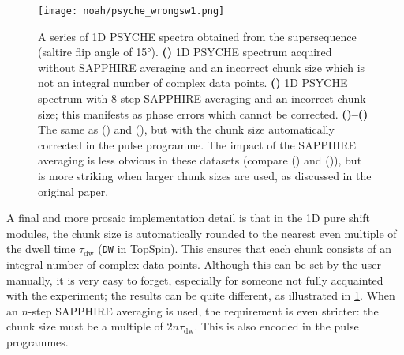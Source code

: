 \begin{figure}[!ht]
    \centering
    \texttt{[image: noah/psyche\_wrongsw1.png]}%
    {\label{fig:psyche_wrongsw1_bad_nosap}}%
    {\label{fig:psyche_wrongsw1_bad_sap}}%
    {\label{fig:psyche_wrongsw1_good_nosap}}%
    {\label{fig:psyche_wrongsw1_good_sap}}%
    \caption[Effect of missetting the chunk size in PSYCHE spectra]{
        A series of 1D PSYCHE spectra obtained from the  supersequence (saltire flip angle of \ang{15}).
        \textbf{()} 1D PSYCHE spectrum acquired without SAPPHIRE averaging and an incorrect chunk size which is not an integral number of complex data points.
        \textbf{()} 1D PSYCHE spectrum with  8-step SAPPHIRE averaging and an incorrect chunk size; this manifests as phase errors which cannot be corrected.
        \textbf{()--()} The same as () and (), but with the chunk size automatically corrected in the pulse programme.
        The impact of the SAPPHIRE averaging is less obvious in these datasets (compare () and ()), but is more striking when larger chunk sizes are used, as discussed in the original paper\autocite{Moutzouri2017CC}.
    }
    \label{fig:psyche_wrongsw1}
\end{figure}

A final and more prosaic implementation detail is that in the 1D pure shift modules, the chunk size is automatically rounded to the nearest even multiple of the dwell time $\tau_\text{dw}$ (\texttt{DW} in TopSpin).
This ensures that each chunk consists of an integral number of complex data points.
Although this can be set by the user manually, it is very easy to forget, especially for someone not fully acquainted with the experiment; the results can be quite different, as illustrated in \cref{fig:psyche_wrongsw1}.
When an $n$-step SAPPHIRE averaging is used, the requirement is even stricter: the chunk size must be a multiple of $2n \tau_\text{dw}$.
This is also encoded in the pulse programmes.
